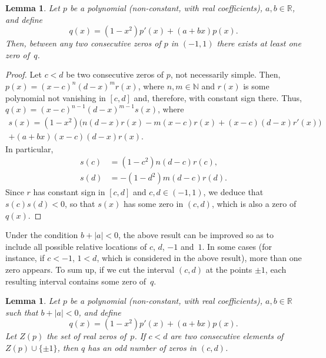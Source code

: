 \documentclass[10pt, a4paper, leqno]{amsart}
\numberwithin{equation}{section}
\theoremstyle{plain}
\newtheorem{Lem}[Theo]{Lemma}
\theoremstyle{remark}
\newcommand{\RR}{\mathbb{R}}
\newcommand{\NN}{\mathbb{N}}
\begin{document}
\begin{Lem}
\label{depaq1}
Let $p$ be a polynomial (non-constant, with real coefficients), $a, b \in \RR$, and define
\[
  q(x) = (1-x^2) p'(x) + (a+bx) p(x).
\]
Then, between any two consecutive zeros of $p$ in $(-1,1)$ there exists at least one zero of~$q$.
\end{Lem}

\begin{proof}
Let $c < d$ be two consecutive zeros of $p$, not necessarily simple. Then, $p(x) = (x-c)^n (d-x)^m r(x)$, where $n, m \in \NN$ and $r(x)$ is some polynomial not vanishing in $[c,d]$ and, therefore, with constant sign there. Thus, $q(x) = (x-c)^{n-1} (d-x)^{m-1} s(x)$, where
\begin{multline*}
  s(x) = (1-x^2) \Big( n(d-x) r(x) - m(x-c)r(x) + (x-c)(d-x) r'(x) \Big)
  \\
  + (a+bx)(x-c)(d-x)r(x).
\end{multline*}
In particular,
\begin{align*}
  s(c) &= (1-c^2) n (d-c) r(c),
  \\
  s(d) &= - (1-d^2) m (d-c) r(d).
\end{align*}
Since $r$ has constant sign in $[c,d]$ and $c, d \in (-1,1)$, we deduce that $s(c) s(d) < 0$, so that $s(x)$ has some zero in $(c,d)$, which is also a zero of $q(x)$.
\end{proof}

Under the condition $b + |a| < 0$, the above result can be improved so as to include all possible relative locations of $c$, $d$, $-1$ and~$1$. In some cases (for instance, if $c < -1$, $1 < d$, which is considered in the above result), more than one zero appears. To sum up, if we cut the interval $(c,d)$ at the points $\pm 1$, each resulting interval contains some zero of~$q$.

\begin{Lem}
\label{depaq2}
Let $p$ be a polynomial (non-constant, with real coefficients), $a, b \in \RR$ such that $b + |a| < 0$, and define
\[
  q(x) = (1-x^2) p'(x) + (a+bx) p(x).
\]
Let $Z(p)$ the set of real zeros of~$p$. If $c < d$ are two consecutive elements of $Z(p) \cup \{\pm 1\}$, then $q$ has an odd number of zeros in $(c,d)$.
\end{Lem}
\end{document}

